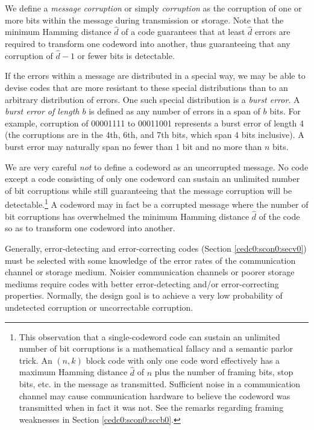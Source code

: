 We define a \emph{message corruption} or simply 
\emph{corruption} as the corruption of one or more bits within the message
during transmission or storage.
Note that the minimum Hamming distance $\hat{d}$ of a code
guarantees that at least $\hat{d}$ errors are required to transform
one codeword into another, thus guaranteeing that any corruption
of $\hat{d}-1$ or fewer bits is detectable.

If the errors within a message are distributed in a special way, we may be
able to devise codes that are more resistant to these special distributions 
than to an arbitrary distribution of errors.  One such special distribution
is a \emph{burst error}.  A \emph{burst error of length $b$}
is defined as any number of errors in a span of $b$ bits.  For example, corruption of
00001111 to 00011001 represents a burst error of length 4 (the corruptions are in 
the 4th, 6th, and 7th bits, which span 4 bits inclusive).  A burst error may naturally
span no fewer than 1 bit and no more than $n$ bits.

We are very careful \emph{not} to define a codeword as an
uncorrupted message.  No code except a code consisting of only one codeword
can sustain an unlimited number of bit corruptions while still guaranteeing
that the message corruption will be detectable.\footnote{This observation that
a single-codeword code can sustain an unlimited number of bit corruptions is a
mathematical fallacy and a semantic parlor trick.  An $(n,k)$ block code with only
one code word effectively has a maximum Hamming distance $\hat{d}$ of $n$ plus the number
of framing bits, stop bits, etc. in the message as transmitted.  Sufficient noise
in a communication channel may cause communication hardware to believe the
codeword was transmitted when in fact it was not.  See the remarks regarding
framing weaknesses in Section \ref{cedc0:scon0:sccb0}.}  A codeword may in fact
be a corrupted message where the number of bit corruptions has overwhelmed the 
minimum Hamming distance $\hat{d}$ of the code so as to transform one codeword
into another.

Generally, error-detecting and error-correcting codes
(Section \ref{cedc0:scon0:secv0}) must be selected with some knowledge 
of the error
rates of the 
communication channel or storage medium.  Noisier communication channels 
or poorer storage mediums require codes with
better error-detecting and/or error-correcting properties.  Normally, the design goal
is to achieve a very low probability of undetected corruption or uncorrectable corruption.


